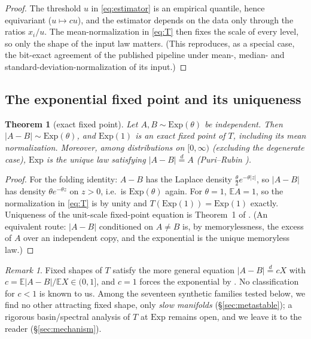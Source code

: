 \documentclass[11pt,a4paper]{article}
\newtheorem{theorem}{Theorem}
\theoremstyle{remark}
\newtheorem{remark}{Remark}
\newcommand{\Exp}{\mathrm{Exp}}
\newcommand{\eqd}{\stackrel{d}{=}}
\begin{document}
\begin{proof}
The threshold $u$ in \eqref{eq:estimator} is an empirical quantile, hence equivariant ($u \mapsto
cu$), and the estimator depends on the data only through the ratios $x_i/u$. The mean-normalization
in \eqref{eq:T} then fixes the scale of every level, so only the shape of the input law matters.
(This reproduces, as a special case, the bit-exact agreement of the published pipeline under
mean-, median- and standard-deviation-normalization of its input.)
\end{proof}

\subsection{The exponential fixed point and its uniqueness}

\begin{theorem}[exact fixed point]\label{thm:exp}
Let $A,B \sim \Exp(\theta)$ be independent. Then $\lvert A-B\rvert \sim \Exp(\theta)$, and
$\Exp(1)$ is an exact fixed point of $T$, including its mean normalization. Moreover, among
distributions on $[0,\infty)$ (excluding the degenerate case), $\Exp$ is the \emph{unique} law
satisfying $\lvert A - B\rvert \eqd A$ \emph{(Puri--Rubin \cite{purirubin})}.
\end{theorem}

\begin{proof}
For the folding identity: $A-B$ has the Laplace density $\tfrac{\theta}{2}e^{-\theta|z|}$, so
$|A-B|$ has density $\theta e^{-\theta z}$ on $z>0$, i.e.\ is $\Exp(\theta)$ again. For
$\theta = 1$, $\mathbb{E}A = 1$, so the normalization in \eqref{eq:T} is by unity and
$T(\Exp(1)) = \Exp(1)$ exactly. Uniqueness of the unit-scale fixed-point equation is Theorem~1 of
\cite{purirubin}. (An equivalent route: $|A-B|$ conditioned on $A\ne B$ is, by memorylessness, the
excess of $A$ over an independent copy, and the exponential is the unique memoryless law.)
\end{proof}

\begin{remark}
Fixed shapes of $T$ satisfy the more general equation $|A-B| \eqd cX$ with
$c = \mathbb{E}|A-B|/\mathbb{E}X \in (0,1]$, and $c=1$ forces the exponential by
\cite{purirubin}. No classification for $c<1$ is known to us. Among the seventeen synthetic families
tested below, we find no other attracting fixed shape, only \emph{slow manifolds}
(\S\ref{sec:metastable}); a rigorous basin/spectral analysis of $T$ at $\Exp$ remains open, and we
leave it to the reader (\S\ref{sec:mechanism}).
\end{remark}
\end{document}
